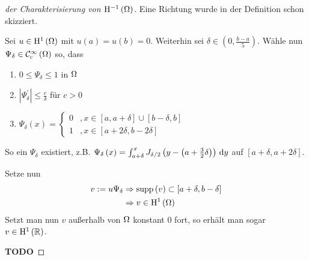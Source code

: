 \begin{proof}[der Charakterisierung von $\mathrm{H}^{-1}\left(\Omega\right)$]
	Eine Richtung wurde in der Definition schon skizziert.
	
	Sei $u\in\mathrm{H}^{1}\left(\Omega\right)$ mit $u\left(a\right)=u\left(b\right)=0$. Weiterhin sei $\delta\in\left(0,\frac{b-a}{5}\right)$.
	Wähle nun $\Psi_{\delta}\in\mathcal{C}^{\infty}_{\text{c}}\left(\Omega\right)$ so, dass
	\begin{enumerate}
		\item $0\leq\Psi_{\delta}\leq 1$ in $\Omega$
		\item $|\Psi_{\delta}^{\prime}|\leq\frac{c}{\delta}$ für $c>0$
		\item $\Psi_{\delta}\left(x\right) = \begin{cases}
			0 &, x\in\left[a,a+\delta\right]\cup\left[b-\delta,b\right]\\
			1 &, x\in\left[a+2\delta,b-2\delta\right]
		\end{cases}$
	\end{enumerate}
	So ein $\Psi_{\delta}$ existiert, z.B. $\Psi_{\delta}\left(x\right)=\int_{a+\delta}^{x}J_{\delta/2}\left(y-\left(a+\frac{3}{2}\delta\right)\right)\,\mathrm{d} y$ auf $\left[a+\delta,a+2\delta\right]$.{}
	
	Setze nun
	\begin{align*}
		v := u\Psi_{\delta} &\Rightarrow \operatorname{supp}\left(v\right) \subset \left[a+\delta,b-\delta\right]\\
			&\Rightarrow v\in\mathrm{H}^{1}\left(\Omega\right)
	\end{align*}
	Setzt man nun $v$ außerhalb von $\Omega$ konstant $0$ fort, so erhält man sogar $v\in\mathrm{H}^{1}\left(\mathbb{R}\right)$.{}
	
	\textbf{TODO}
\end{proof}

